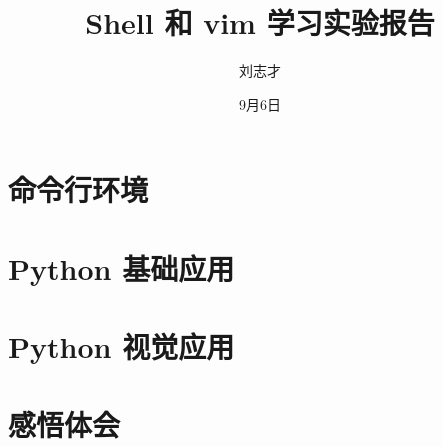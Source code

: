 \documentclass[16pt]{lzc}
\title{Shell 和 vim 学习实验报告}
\author{刘志才}
\date{9月6日}
\begin{document}
    \maketitlepage
    \tableofcontents
    \newpage
    \setcounter{page}{1}


    \section{命令行环境}\label{sec:1}
        


    \section{Python 基础应用}\label{sec:python1}
        


    \section{Python 视觉应用}\label{sec:python2}
        


    \section{感悟体会}\label{sec:3}
        
\end{document}
